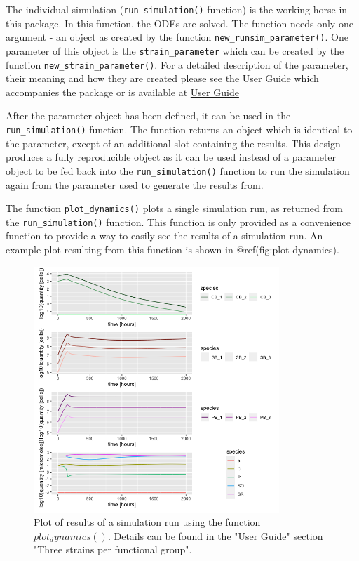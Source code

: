 \documentclass[]{elsarticle} %
\begin{document}
The individual simulation (\texttt{run\_simulation()} function) is the
working horse in this package. In this function, the ODEs are solved.
The function needs only one argument - an object as created by the
function \texttt{new\_runsim\_parameter()}. One parameter of this object
is the \texttt{strain\_parameter} which can be created by the function
\texttt{new\_strain\_parameter()}. For a detailed description of the
parameter, their meaning and how they are created please see the User
Guide which accompanies the package or is available at
\href{@LINK_NEEDED}{User Guide}

After the parameter object has been defined, it can be used in the
\texttt{run\_simulation()} function. The function returns an object
which is identical to the parameter, except of an additional slot
containing the results. This design produces a fully reproducible object
as it can be used instead of a parameter object to be fed back into the
\texttt{run\_simulation()} function to run the simulation again from the
parameter used to generate the results from.

The function \texttt{plot\_dynamics()} plots a single simulation run, as
returned from the \texttt{run\_simulation()} function. This function is
only provided as a convenience function to provide a way to easily see
the results of a simulation run. An example plot resulting from this
function is shown in @ref(fig:plot-dynamics).

\begin{figure}

{\centering \includegraphics[width=350px]{figures/ug_three_strains_dynamics} 

}

\caption{Plot of results of a simulation run using the function $plot_dynamics()$. Details can be found in the "User Guide" section "Three strains per functional group".}\label{fig:plot-dynamics}
\end{figure}
\end{document}

